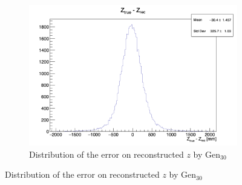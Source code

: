 \documentclass[../main.tex]{subfiles}
\begin{document}
{{\begin{figure}[ht]
\begin{subfigure}[t]{0.32\linewidth}
    \includegraphics[width=\linewidth]{images/jcnn/vic_cnn/cnn_delta_z.png}
    \caption{Distribution of the error on reconstructed $z$ by $\mathrm{Gen}_{30}$}
    \label{fig:jcnn:vic_cnn:cnn_delta_z}
  \end{subfigure}



\end{figure}}}
\end{document}
